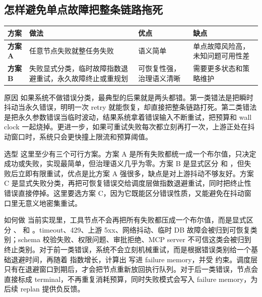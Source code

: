 \documentclass[12pt]{article}
\begin{document}
\subsection{怎样避免单点故障把整条链路拖死}
\begin{center}
\small
\begin{tabularx}{\textwidth}{>{\bfseries}lXXX}
\toprule
方案 & 做法 & 优点 & 缺点 \\
\midrule
方案 A & 任意节点失败就整任务失败 & 语义简单 & 单点故障风险高，未知问题可用性差 \\
方案 B & 失败显式分类，临时故障指数退避重试，永久故障终止或重规划 & 可恢复性强，治理语义清晰 & 需要更多状态和策略维护 \\
\bottomrule
\end{tabularx}
\end{center}

\begin{qaBox}{原因}
如果系统不做错误分类，最典型的后果就是两头都错。第一类错法是把瞬时抖动当永久错误，明明一次 retry 就能恢复，却直接把整条链路打死。第二类错法是把永久参数错误当临时波动，结果系统拿着错误输入不断重试，把预算和 wall clock 一起烧掉。更进一步，如果可重试失败每次都立刻再打一次，上游正处在抖动窗口时，系统只会更快撞上限流和预算阈值。
\end{qaBox}

\begin{qaBox}{选型}
这里至少有三个可行方案。方案 A 是所有失败都统一成一个布尔值，只决定成功或失败，实现最简单，但治理语义几乎为零。方案 B 是显式区分  和 ，但失败后立即有限重试，优点是比方案 A 强很多，缺点是对上游抖动不够友好。方案 C 是显式失败分类，再把可恢复错误交给调度层做指数退避重试，同时把终止性错误直接停掉。这里要选方案 C，因为它既能区分错误性质，又能避免在抖动窗口里无意义地密集重试。
\end{qaBox}

\begin{qaBox}{如何做}
当前实现里，工具节点不会再把所有失败都压成一个布尔值，而是显式区分 、 和 。timeout、429、上游 5xx、网络抖动、临时 DB 故障会被归到可恢复类别；schema 校验失败、权限问题、审批拒绝、MCP server 不可信这类会被归到终止类别。对于前一类错误，系统不会立刻机械重试，而是根据错误类别给一个基础退避时间，再随着  指数增长，计算出  写进 failure memory，并受  约束。调度层只有在退避窗口到期后，才会把节点重新放回执行队列。对于后一类错误，节点会直接标成 terminal，不再重复消耗预算，同时失败模式会写入 failure memory，为后续 replan 提供负反馈。
\end{qaBox}
\end{document}
